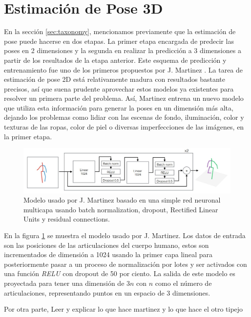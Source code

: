 \section{Estimación de Pose 3D}

En la sección \ref{sec:taxonomy}, mencionamos previamente que la estimación de pose puede hacerse
en dos etapas. La primer etapa encargada de predecir las poses en 2 dimensiones y la segunda en
realizar la predicción a 3 dimensiones a partir de los resultados de la etapa anterior. Este esquema
de predicción y entrenamiento fue uno de los primeros propuestos por J. Martinez
\cite{DBLP:journals/corr/MartinezHRL17}. La tarea de estimación de pose 2D está relativamente madura
con resultados bastante precisos, así que suena prudente aprovechar estos modelos ya existentes para
resolver un primera parte del problema. Así, Martinez entrena un nuevo modelo que utiliza esta
información para generar la poses en un dimensión más alta, dejando los problemas como lidiar con las
escenas de fondo, iluminación, color y texturas de las ropas, color de piel o diversas imperfecciones
de las imágenes, en la primer etapa.

\begin{figure}[!ht]
    \centering
    \includegraphics[width=.9\textwidth]{Chapters/3. Trans-HPE/img/martinez_model.jpeg}
    \caption[2D a 3D model]{Modelo usado por J. Martinez \cite{DBLP:journals/corr/MartinezHRL17}
    basado en una simple red neuronal multicapa usando batch normalization, dropout, Rectified
    Linear Units y residual connections.}
\label{fig:model_martinez}
\end{figure}

En la figura \ref{fig:model_martinez} se muestra el modelo usado por J. Martinez. Los datos de entrada
son las posiciones de las articulaciones del cuerpo humano, estos son incrementados de dimensión a
1024 usando la primer capa lineal para posteriormente pasar a un proceso de normalización por lotes
y ser activados con una función \textit{RELU} con dropout de 50 por ciento. La salida de este modelo
es proyectada para tener una dimensión de $3n$ con $n$ como el número de articulaciones, representando
puntos en un espacio de 3 dimensiones.

Por otra parte,
Leer y explicar lo que hace martinez
y lo que hace el otro tipejo

